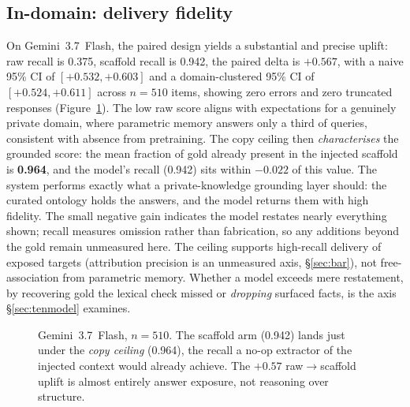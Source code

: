 \documentclass[10pt,twocolumn]{article}
\begin{document}
\subsection{In-domain: delivery fidelity}\label{sec:indomain}
On Gemini~3.7~Flash, the paired design yields a substantial and precise uplift: raw recall is 0.375, scaffold recall is 0.942, the paired delta is $\mathbf{+0.567}$, with a naive 95\% CI of $[+0.532,+0.603]$ and a domain-clustered 95\% CI of $[+0.524,+0.611]$ across $n=510$ items, showing zero errors and zero truncated responses (Figure~\ref{fig:anchor}). The low raw score aligns with expectations for a genuinely private domain, where parametric memory answers only a third of queries, consistent with absence from pretraining. The copy ceiling then \emph{characterises} the grounded score: the mean fraction of gold already present in the injected scaffold is \textbf{0.964}, and the model's recall (0.942) sits within $-0.022$ of this value. The system performs exactly what a private-knowledge grounding layer should: the curated ontology holds the answers, and the model returns them with high fidelity. The small negative gain indicates the model restates nearly everything shown; recall measures omission rather than fabrication, so any additions beyond the gold remain unmeasured here. The ceiling supports high-recall delivery of exposed targets (attribution precision is an unmeasured axis, \S\ref{sec:bar}), not free-association from parametric memory. Whether a model exceeds mere restatement, by recovering gold the lexical check missed or \emph{dropping} surfaced facts, is the axis \S\ref{sec:tenmodel} examines.

\begin{figure}[t]\centering
{}
\caption{Gemini~3.7~Flash, $n=510$. The scaffold arm (0.942) lands just under the \emph{copy ceiling}
(0.964), the recall a no-op extractor of the injected context would already achieve. The $+0.57$
raw$\to$scaffold uplift is almost entirely answer exposure, not reasoning over structure.}
\label{fig:anchor}
\end{figure}
\end{document}
